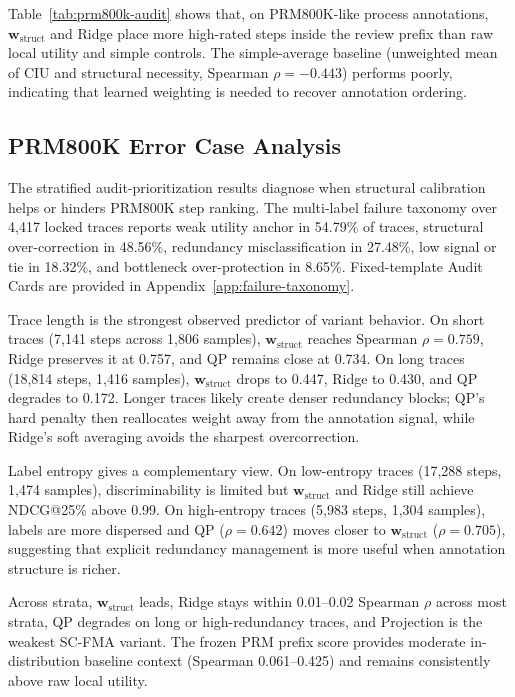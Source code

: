 \documentclass[a4paper,fleqn]{cas-sc}
\newcommand{\wstruct}{\ensuremath{\mathbf{w}_{\mathrm{struct}}}}
\begin{document}
Table~\ref{tab:prm800k-audit} shows that, on PRM800K-like process annotations, \wstruct{} and Ridge place more high-rated steps inside the review prefix than raw local utility and simple controls. The simple-average baseline (unweighted mean of CIU and structural necessity, Spearman $\rho = -0.443$) performs poorly, indicating that learned weighting is needed to recover annotation ordering.

\subsection{PRM800K Error Case Analysis}
\label{sec:prm800k-error}

The stratified audit-prioritization results diagnose when structural calibration helps or hinders PRM800K step ranking. The multi-label failure taxonomy over 4,417 locked traces reports weak utility anchor in 54.79\% of traces, structural over-correction in 48.56\%, redundancy misclassification in 27.48\%, low signal or tie in 18.32\%, and bottleneck over-protection in 8.65\%. Fixed-template Audit Cards are provided in Appendix~\ref{app:failure-taxonomy}.

Trace length is the strongest observed predictor of variant behavior. On short traces (7,141 steps across 1,806 samples), \wstruct{} reaches Spearman $\rho = 0.759$, Ridge preserves it at 0.757, and QP remains close at 0.734. On long traces (18,814 steps, 1,416 samples), \wstruct{} drops to 0.447, Ridge to 0.430, and QP degrades to 0.172. Longer traces likely create denser redundancy blocks; QP's hard penalty then reallocates weight away from the annotation signal, while Ridge's soft averaging avoids the sharpest overcorrection.

Label entropy gives a complementary view. On low-entropy traces (17,288 steps, 1,474 samples), discriminability is limited but \wstruct{} and Ridge still achieve NDCG@25\% above 0.99. On high-entropy traces (5,983 steps, 1,304 samples), labels are more dispersed and QP ($\rho = 0.642$) moves closer to \wstruct{} ($\rho = 0.705$), suggesting that explicit redundancy management is more useful when annotation structure is richer.

Across strata, \wstruct{} leads, Ridge stays within 0.01--0.02 Spearman $\rho$ across most strata, QP degrades on long or high-redundancy traces, and Projection is the weakest SC-FMA variant. The frozen PRM prefix score provides moderate in-distribution baseline context (Spearman 0.061--0.425) and remains consistently above raw local utility.
\end{document}
